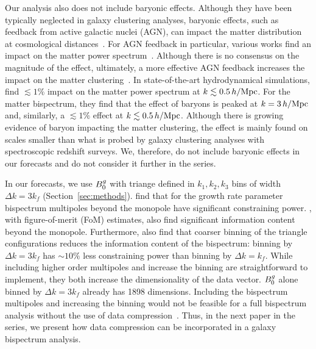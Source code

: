 Our analysis also does not include baryonic effects. Although they have been 
typically neglected in galaxy clustering analyses, baryonic effects, such as
feedback from active galactic nuclei (AGN), can impact the matter distribution
at cosmological distances~\citep[\eg][]{white2004, zhan2004, jing2006,
rudd2008, harnois-deraps2015}. %
For AGN feedback in particular, various works find an impact on the matter 
power spectrum~\citep[\eg][]{vandaalen2011, vogelsberger2014, hellwing2016, peters2018,
springel2018, chisari2018, vandaalen2020}. %
Although there is no consensus on the magnitude of the effect, ultimately, a 
more effective AGN feedback increases the impact on the matter 
clustering~\citep{barreira2019}. In state-of-the-art hydrodynamical simulations,
\cite{foreman2019} find $\lesssim 1\%$ impact on 
the matter power spectrum at $k \lesssim 0.5\,h/\mathrm{Mpc}$. For the matter bispectrum, 
they find that the effect of baryons is peaked at $k=3\,h/\mathrm{Mpc}$ and, 
similarly, a $\lesssim1\%$ effect at $k \lesssim 0.5\,h/\mathrm{Mpc}$. Although there is growing
evidence of baryon impacting the matter clustering, the effect is mainly
found on scales smaller than what is probed by galaxy clustering analyses with
spectroscopic redshift surveys. We, therefore, do not include baryonic effects
in our forecasts and do not consider it further in the series. 

In our forecasts, we use $B^g_0$ with triange defined in $k_1,k_2,k_3$ bins of
width $\Delta k = 3 k_f$ (Section~\ref{sec:methods}).
\cite{gagrani2017} find that for the growth rate parameter bispectrum
multipoles beyond the monopole have significant constraining power.  
\cite{yankelevich2019}, with figure-of-merit (FoM) estimates, also find
significant information content beyond the monopole. Furthermore, 
\cite{yankelevich2019} also find that coarser binning of the triangle
configurations reduces the information content of the bispectrum: binning by
$\Delta k = 3 k_f$ has ${\sim}10\%$ less constraining power than binning by
$\Delta k = k_f$. While including higher order multipoles and increase the binning 
are straightforward to implement, they both increase the dimensionality of the 
data vector. $B^g_0$ alone binned by $\Delta k = 3 k_f$ already has 1898
dimensions. Including the bispectrum multipoles and increasing the
binning would not be feasible for a full bispectrum analysis without the use of data
compression~\citep[\eg][]{byun2017, gualdi2018, gualdi2019a, gualdi2019}. 
Thus, in the next paper in the series, we present how data compression can be
incorporated in a galaxy bispectrum analysis.

